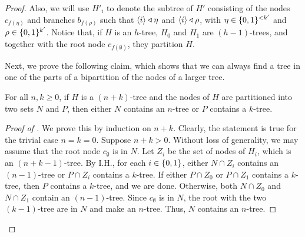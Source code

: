 \begin{theorem}
\begin{proof}
                Also, we will use $H'_i$ to denote the subtree of $H'$ consisting of the nodes $c_{f(\eta)}$ and branches
                $b_{f(\rho)}$ such that $\left< i \right> \triangleleft \eta$ and $\left< i \right> \triangleleft \rho$, with $\eta \in \{ 0,1 \}^{<k'}$
                and $\rho \in \{ 0,1 \}^{k'}$.
                Notice that, if $H$ is an $h$-tree, $H_0$ and $H_1$ are $(h-1)$-trees, and together with the root node
                $c_{f(\emptyset)}$, they partition $H$.

                Next, we prove the following claim, which shows that we can always find a tree
                in one of the parts of a bipartition of the nodes of a larger tree.

                \begin{claim} \label{clm:n_or_k_tree_in_partition_of_n_plus_k_tree}
                    For all $n, k \geq 0$, if $H$ is a $(n + k)$-tree and the nodes of $H$ are partitioned into two sets $N$ and $P$,
                    then either $N$ contains an $n$-tree or $P$ contains a $k$-tree.
                    \begin{proof}[Proof of ]
                        We prove this by induction on $n + k$.
                        Clearly, the statement is true for the trivial case $n = k = 0$.
                        Suppose $n + k > 0$.
                        Without loss of generality, we may assume that the root node $c_\emptyset$ is in $N$.
                        Let $Z_i$ be the set of nodes of $H_i$, which is an $(n+k-1)$-tree.
                        By I.H., for each $i \in \{ 0,1 \}$, either $N \cap Z_i$ contains an $(n-1)$-tree or
                        $P \cap Z_i$ contains a $k$-tree.
                        If either $P \cap Z_0$ or $P \cap Z_1$ contains a $k$-tree, then $P$ contains a $k$-tree, and we are done.
                        Otherwise, both $N \cap Z_0$ and $N \cap Z_1$ contain an $(n-1)$-tree.
                        Since $c_\emptyset$ is in $N$, the root with the two $(k-1)$-tree are in $N$ and make an $n$-tree.
                        Thus, $N$ contains an $n$-tree.
                    \end{proof}
                \end{claim}


\end{proof}
\end{theorem}
